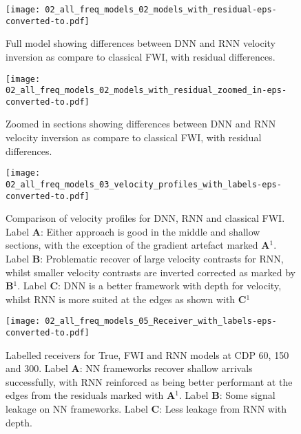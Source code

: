 {\begin{figure}[ht!]
    \centering
    \texttt{[image: 02\_all\_freq\_models\_02\_models\_with\_residual-eps-converted-to.pdf]}
    \caption[Pseudo-spectral NN framework comparison of velocity inversion.]{Full model showing differences between DNN and RNN velocity inversion as compare to classical FWI, with residual differences.}
    \label{fig:dnn_rnn_models}
\end{figure}

\begin{figure}[ht!]
    \centering
    \texttt{[image: 02\_all\_freq\_models\_02\_models\_with\_residual\_zoomed\_in-eps-converted-to.pdf]}
    \caption[Zoomed In pseudo-spectral NN framework comparison]{Zoomed in sections showing differences between DNN and RNN velocity inversion as compare to classical FWI, with residual differences.}
    \label{fig:dnn_rnn_model_zoomed_in}
\end{figure}

\begin{figure}[ht!]
    \centering
    \texttt{[image: 02\_all\_freq\_models\_03\_velocity\_profiles\_with\_labels-eps-converted-to.pdf]}
    \caption[Velocity profiles for pseudo-spectral NN framework comparison.]{Comparison of velocity profiles for DNN, RNN and classical FWI. Label \textbf{A}: Either approach is good in the middle and shallow sections, with the exception of the gradient artefact marked \textbf{A$^{1}$}. Label \textbf{B}: Problematic recover of large velocity contrasts for RNN, whilst smaller velocity contrasts are inverted corrected as marked by \textbf{B$^{1}$}. Label \textbf{C}: DNN is a better framework with depth for velocity, whilst RNN is more suited at the edges as shown with \textbf{C$^{1}$}}
    \label{fig:dnn_rnn_velocity_profiles}
\end{figure}

\begin{figure}[ht!]
    \centering
    \texttt{[image: 02\_all\_freq\_models\_05\_Receiver\_with\_labels-eps-converted-to.pdf]}
    \caption[Labelled receivers for pseudo-spectral NN framework comparison.]{Labelled receivers for True, FWI and RNN models at CDP 60, 150 and 300. Label \textbf{A}: NN frameworks recover shallow arrivals successfully, with RNN reinforced as being better performant at the edges from the residuals marked with \textbf{A$^1$}. Label \textbf{B}: Some signal leakage on NN frameworks. Label \textbf{C}: Less leakage from RNN with depth.}
    \label{fig:dnn_rnn_receivers}
\end{figure}

}
